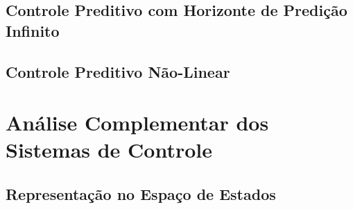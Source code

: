 \subsection{Controle Preditivo com Horizonte de Predição Infinito}
\label{subsec:controle_preditivo_com_horizonte_preditivo_infinito}


\subsection{Controle Preditivo Não-Linear}
\label{subsec:controle_preditivo_nao_linear}


\section{Análise Complementar dos Sistemas de Controle}
\label{sec:analise_complementar_dos_sistemas_de_controle}


\subsection{Representação no Espaço de Estados}
\label{subsec:representacao_no_espaco_de_estados}

